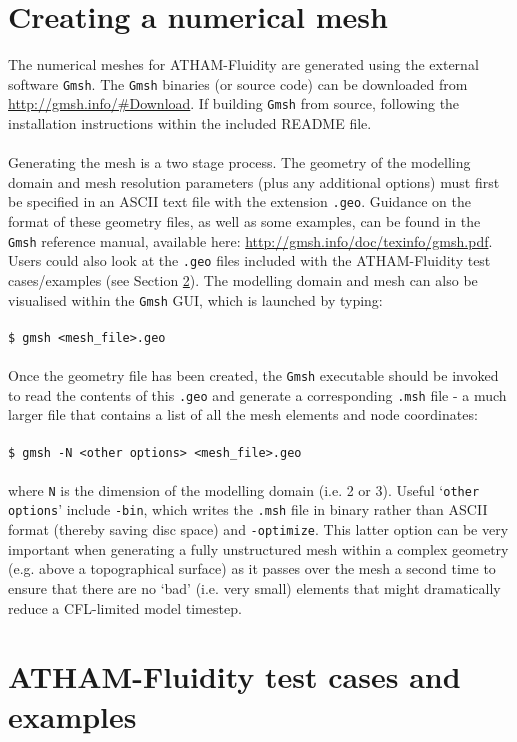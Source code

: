 \documentclass[10pt,a4paper]{article}
\newcommand\tab[1][0.5cm]{\hspace*{#1}}
\begin{document}
\section{Creating a numerical mesh} \label{Mesh}
The numerical meshes for ATHAM-Fluidity are generated using the external software \texttt{Gmsh}. The \texttt{Gmsh} binaries (or source code) can be downloaded from \url{http://gmsh.info/#Download}. If building \texttt{Gmsh} from source, following the installation instructions within the included README file.\\\\
Generating the mesh is a two stage process. The geometry of the modelling domain and mesh resolution parameters (plus any additional options) must first be specified in an ASCII text file with the extension \texttt{.geo}. Guidance on the format of these geometry files, as well as some examples, can be found in the \texttt{Gmsh} reference manual, available here: \url{http://gmsh.info/doc/texinfo/gmsh.pdf}. Users could also look at the \texttt{.geo} files included with the ATHAM-Fluidity test cases/examples (see Section \ref{Tests}). The modelling domain and mesh can also be visualised within the \texttt{Gmsh} GUI, which is launched by typing:\\\\
\tab \texttt{\$ gmsh <mesh\_file>.geo}\\\\
Once the geometry file has been created, the \texttt{Gmsh} executable should be invoked to read the contents of this \texttt{.geo} and generate a corresponding \texttt{.msh} file - a much larger file that contains a list of all the mesh elements and node coordinates:\\\\
\tab \texttt{\$ gmsh -N <other options> <mesh\_file>.geo}\\\\
where \texttt{N} is the dimension of the modelling domain (i.e. 2 or 3). Useful `\texttt{other options}' include \texttt{-bin}, which writes the \texttt{.msh} file in binary rather than ASCII format (thereby saving disc space) and \texttt{-optimize}. This latter option can be very important when generating a fully unstructured mesh within a complex geometry (e.g. above a topographical surface) as it passes over the mesh a second time to ensure that there are no `bad' (i.e. very small) elements that might dramatically reduce a CFL-limited model timestep.

\section{ATHAM-Fluidity test cases and examples} \label{Tests}
\end{document}
